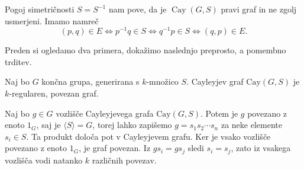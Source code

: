 \begin{opomba}
Pogoj simetričnosti $S = S^{-1}$ nam pove, da je $\operatorname{Cay}(G, S)$ pravi graf in ne zgolj usmerjeni. Imamo namreč \begin{equation*}
(p,q) \in  E \iff p^{-1}q \in S \iff q^{-1}p \in S \iff (q,p) \in  E.
\end{equation*}  
\end{opomba}

Preden si ogledamo dva primera, dokažimo naslednjo preprosto, a pomembno trditev.

\begin{trditev}\label{trd_lastnosti_cayleyjevega_grafa}
    Naj bo $G$ končna grupa, generirana s $k$-množico $S$. Cayleyjev graf $\text{Cay}(G, S)$ je $k$-regularen, povezan graf.
\end{trditev}
\begin{dokaz}
    Naj bo $g \in G$ vozlišče Cayleyjevega grafa $\text{Cay}(G, S)$. Potem je $g$ povezano z enoto $1_G$, saj je $\langle S \rangle = G$, torej lahko zapišemo
    $g = s_1 s_2 \cdots s_n$ za neke elemente $s_i \in S$. Ta produkt določa pot v Cayleyjevem grafu. Ker je vsako vozlišče povezano z enoto $1_G$, je graf povezan. Iz $g s_i = g s_j$ sledi $s_i = s_j$, zato iz vsakega vozlišča vodi natanko $k$ različnih povezav.
\end{dokaz}

